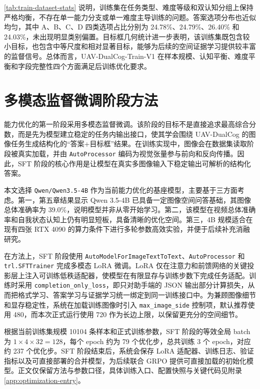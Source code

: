 \autoref{tab:train-dataset-stats} 说明，训练集在任务类型、难度等级和双认知分组上保持严格均衡，不存在单一能力分支或单一难度主导训练的问题。答案选项分布也近似均匀，其中 A、B、C、D 四类选项占比分别为 24.78\%、24.79\%、26.40\% 和 24.03\%，未出现明显类别偏置。目标框几何统计进一步表明，该训练集既包含较小目标，也包含中等尺度和相对显著目标，能够为后续的空间证据学习提供较丰富的监督信号。总体而言，UAV-DualCog-Train-V1 在样本规模、认知平衡、难度平衡和字段完整性四个方面满足后训练优化要求。

\section{多模态监督微调阶段方法}

能力优化的第一阶段采用多模态监督微调。该阶段的目标不是直接追求最高综合分数，而是先为模型建立稳定的任务内输出接口，使其学会围绕 UAV-DualCog 的图像任务生成结构化的“答案+目标框”结果。在训练实现中，图像会在数据集读取阶段被真实加载，并由 \texttt{AutoProcessor} 编码为视觉张量参与前向和反向传播。因此，SFT 阶段的核心作用是让模型在真实多图像输入下稳定输出可解析的结构化答案。

本文选择 \texttt{Qwen/Qwen3.5-4B} 作为当前能力优化的基座模型，主要基于三方面考虑。第一，第五章结果显示 Qwen 3.5-4B 已具备一定图像空间问答基础，其图像总体准确率为 39.0\%，说明模型并非从零开始学习。第二，该模型在视频总体准确率和自我状态认知上仍有明显短板，具备清晰的优化空间。第三，4B 规模适合在现有四张 RTX 4090 的算力条件下进行多轮参数高效实验，并便于后续补充消融研究。

在方法上，SFT 阶段使用 \texttt{AutoModelForImageTextToText}、\texttt{AutoProcessor} 和 \texttt{trl.SFTTrainer} 完成多模态 LoRA 微调。LoRA 仅在注意力和前馈网络的关键投影层上注入可训练低秩适配器，使模型在有限显存与训练步数下完成任务适配。训练时采用 \texttt{completion\_only\_loss}，即只对助手端的 JSON 输出部分计算损失，从而把格式学习、答案学习与证据学习统一绑定到同一训练接口中。为兼顾图像细节和显存稳定性，系统在加载训练图像时引入 \texttt{max\_image\_side} 控制项，默认推荐使用 480，而本次正式运行使用 720 作为长边上限，以保留更充分的空间细节。

根据当前训练集规模 10104 条样本和正式训练参数，SFT 阶段的等效全局 batch 为 \(1 \times 4 \times 32 = 128\)，每个 epoch 约为 79 个优化步，总共训练 3 个 epoch，对应约 237 个优化步。SFT 阶段结束后，系统会保存 LoRA 适配器、训练日志、验证指标以及可直接部署的合并模型，为后续联合 GRPO 提供可直接加载的初始化模型。正文仅保留方法与参数口径，具体训练入口、配置快照与关键代码见附录\autoref{app:optimization-entry}。

